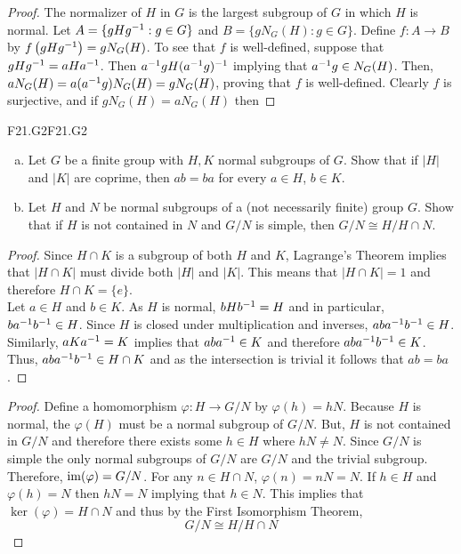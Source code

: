 \documentclass[../AlgebraQualSolutions.tex]{subfiles}
\begin{document}
	\begin{proof}
		The normalizer of $H$ in $G$ is the largest subgroup of $G$ in which $H$ is normal. Let $A = \{gHg^{-1}: g \in G\}$ and $B = \{gN_G(H): g \in G\}$. Define $f: A \to B$ by $f\left(gHg^{-1}\right) = gN_G(H)$. To see that $f$ is well-defined, suppose that $gHg^{-1} = aHa^{-1}$. Then $a^{-1} g H  (a^{-1} g)^{-1}$ implying that $a^{-1} g \in N_G(H)$. Then, $aN_G(H) = a(a^{-1} g)N_G(H) = gN_G(H)$, proving that  $f$ is well-defined. Clearly $f$ is surjective, and if $gN_G(H) = aN_G(H)$ then 
	\end{proof}

	\begin{prob}{F21.G2}{F21.G2}
	\begin{enumerate}[(a)]
	\item Let $G$ be a finite group with $H,K$ normal subgroups of $G$. Show that if $|H|$ and $|K|$ are coprime, then $ab = ba$ for every $a \in H$, $b \in K$.
	\item Let $H$ and $N$ be normal subgroups of a (not necessarily finite) group $G$. Show that if $H$ is not contained in $N$ and $G/N$ is simple, then $G/N \cong H/H\cap N$.
	\end{enumerate}
	\end{prob}
	
	\begin{proof}
	Since  $H \cap K$ is a subgroup of both $H$ and $K$, Lagrange's Theorem implies that $|H \cap K|$ must divide both $|H|$ and $|K|$. This means that $|H \cap K| =1$ and therefore $H \cap K = \{e\}$.\\
	
	Let $a \in H$ and $b \in K$. As $H$ is normal, $bHb^{-1} = H$ and in particular, $ba^{-1} b^{-1} \in H$. Since $H$ is closed under multiplication and inverses, $aba^{-1} b^{-1} \in H$. Similarly, $aK a^{-1} = K$ implies that $aba^{-1} \in K$ and therefore $aba^{-1} b^{-1} \in K$. Thus, $aba^{-1} b^{-1} \in H \cap K$ and as the intersection is trivial it follows that $ab =ba$.
	\end{proof}
	
	\begin{proof}
	Define a homomorphism $\varphi: H \to G/N$ by $\varphi(h) = hN$. Because $H$ is normal, the $\varphi(H)$ must be a normal subgroup of $G/N$. But, $H$ is not contained in $G/N$ and therefore there exists some $h\in H$ where $hN \neq N$. Since $G/N$ is simple the only normal subgroups of $G/N$ are $G/N$ and the trivial subgroup. Therefore, $\mathrm{im}(\varphi) = G/N$. For any $n \in H \cap N$, $\varphi(n) = nN = N$. If $h \in H$ and $\varphi(h) = N$ then $hN = N$ implying that $h \in N$. This implies that $\ker(\varphi) = H\cap N$ and thus by the First Isomorphism Theorem,
		\[G/N \cong H/H\cap N\]
	\end{proof}
\end{document}
